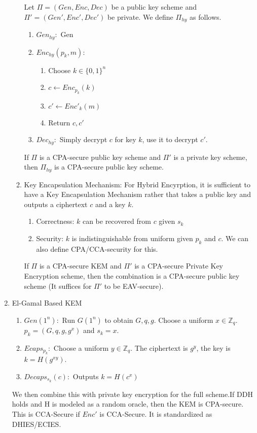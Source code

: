 \documentclass[12pt,letterpaper]{article}
\begin{document}
\begin{enumerate}
\begin{enumerate}
   				Let $\Pi=(Gen,Enc,Dec)$ be a public key scheme and $\Pi'=(Gen',Enc',Dec')$ be private. We define $\Pi_{hy}$ as follows.
   			\begin{enumerate}
   				\item $Gen_{hy}:$ Gen
   				\item $Enc_{hy}(p_k,m):$ 
   					\begin{enumerate}
   						\item Choose $k\in\{0,1\}^n$
   						\item $c\leftarrow Enc_{p_k}(k)$
   						\item $c'\leftarrow Enc'_k(m)$
   						\item Return $c,c'$
   					\end{enumerate} 
   				\item $Dec_{hy}:$ Simply decrypt $c$ for key $k$, use it to decrypt $c'$.
   			\end{enumerate}
   			If $\Pi$ is a CPA-secure public key scheme and $\Pi'$ is a private key scheme, then $\Pi_{hy}$ is a CPA-secure public key scheme. 
   		\item Key Encapsulation Mechanism: For Hybrid Encyrption, it is sufficient to have a Key Encapsulation Mechanism rather that takes a public key and outputs a ciphertext $c$ and a key $k$. 
   		\begin{enumerate}
   			\item Correctness: $k$ can be recovered from $c$ given $s_k$
   			\item Security: $k$ is indistinguishable from uniform given $p_k$ and $c$. We can also define CPA/CCA-security for this.   			
   		\end{enumerate}
   		If $\Pi$ is a CPA-secure KEM and $\Pi'$ is a CPA-secure Private Key Encryption scheme, then the combination is a CPA-secure public key scheme (It suffices for $\Pi'$ to be EAV-secure).
   		\end{enumerate}\newpage
   		\item El-Gamal Based KEM
   		\begin{enumerate}
   			\item $Gen(1^n):$ Run $G(1^n)$ to obtain $G,q,g$. Choose a uniform $x\in\mathbb{Z}_q$. $p_k=(G,q,g,g^x)$ and $s_k=x$.
   			\item $Ecaps_{p_k}:$ Choose a uniform $y\in\mathbb{Z}_q$. The ciphertext is $g^y$, the key is $k=H(g^{xy})$.
   			\item $Decaps_{s_k}(c): $ Outputs $k=H(c^x)$
   		\end{enumerate}
   		We then combine this with private key encryption for the full scheme.\smallskip\newline If DDH holds and H is modeled as a random oracle, then the KEM is CPA-secure. This is CCA-Secure if $Enc'$ is CCA-Secure. It is standardized as DHIES/ECIES.

\end{enumerate}
\end{document}
